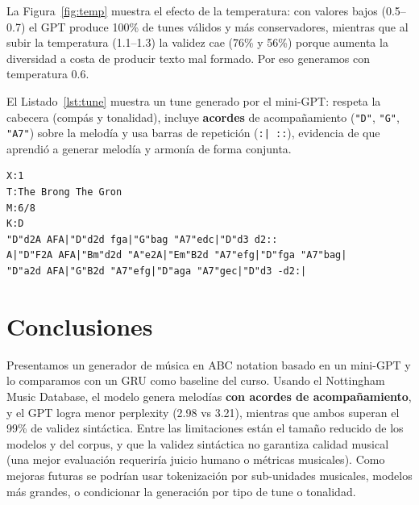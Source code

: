 \documentclass[twocolumn]{article}
\begin{document}
La Figura~\ref{fig:temp} muestra el efecto de la temperatura: con valores bajos
(0.5--0.7) el GPT produce 100\% de tunes válidos y más conservadores, mientras que
al subir la temperatura (1.1--1.3) la validez cae (76\% y 56\%) porque aumenta la
diversidad a costa de producir texto mal formado. Por eso generamos con
temperatura 0.6.

El Listado~\ref{lst:tune} muestra un tune generado por el mini-GPT: respeta la
cabecera (compás y tonalidad), incluye \textbf{acordes} de acompañamiento
(\texttt{"D"}, \texttt{"G"}, \texttt{"A7"}) sobre la melodía y usa barras de
repetición (\texttt{:| ::}), evidencia de que aprendió a generar melodía y armonía
de forma conjunta.

\begin{lstlisting}[caption={Tune generado por el mini-GPT (temperatura 0.6).},label=lst:tune]
X:1
T:The Brong The Gron
M:6/8
K:D
"D"d2A AFA|"D"d2d fga|"G"bag "A7"edc|"D"d3 d2::
A|"D"F2A AFA|"Bm"d2d "A"e2A|"Em"B2d "A7"efg|"D"fga "A7"bag|
"D"a2d AFA|"G"B2d "A7"efg|"D"aga "A7"gec|"D"d3 -d2:|
\end{lstlisting}

\section{Conclusiones}
Presentamos un generador de música en ABC notation basado en un mini-GPT y lo
comparamos con un GRU como baseline del curso. Usando el Nottingham Music Database, el modelo genera
melodías \textbf{con acordes de acompañamiento}, y el GPT logra menor perplexity
(2.98 vs 3.21), mientras que ambos superan el 99\% de validez
sintáctica. Entre las limitaciones están el tamaño reducido de los modelos y del
corpus, y que la validez sintáctica no garantiza calidad musical (una mejor
evaluación requeriría juicio humano o métricas musicales). Como mejoras futuras se
podrían usar tokenización por sub-unidades musicales, modelos más grandes, o
condicionar la generación por tipo de tune o tonalidad.



\end{document}
